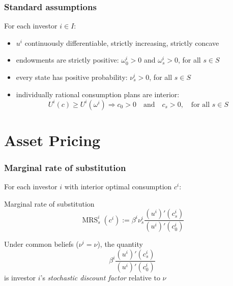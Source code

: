 \documentclass[blue]{beamer}
\def\geq{\geqslant}
\def\et{\quad \textrm{and} \quad}
\DeclareMathOperator\MRS{MRS}
\theoremstyle{definition}
\theoremstyle{example}
\begin{document}
\begin{frame}\frametitle{Standard assumptions}
For each investor $i \in I$:
\begin{itemize}
\item[(C.1)] $u^i$ continuously differentiable, strictly increasing, strictly concave
\item[(C.2)] endowments are strictly positive: $\omega^i_0 > 0$ and $\omega^i_s > 0$, for all $s\in S$
\item[(C.3)] every state has positive probability: $\nu^i_s > 0$, for all $s\in S$
\item[(C.4)] individually rational consumption plans are interior:
\begin{equation*}
U^i(c) \geq U^i(\omega^i) \Longrightarrow c_0 > 0 \et c_s > 0, \quad \text{for all $s\in S$}
\end{equation*}
\end{itemize}
\end{frame}

\section{Asset Pricing}

\begin{frame}\frametitle{Marginal rate of substitution}
For each investor $i$ with interior optimal consumption $c^i$:
\bigskip

\begin{block}{Marginal rate of substitution}
\begin{equation*}
\MRS^i_s(c^i) := \beta^i \nu^i_s \frac{(u^i)'(c^i_s)}{(u^i)'(c^i_0)}
\end{equation*}
\end{block}
\bigskip

Under common beliefs ($\nu^i = \nu$), the quantity
\begin{equation*}
\beta^i \frac{(u^i)'(c^i_s)}{(u^i)'(c^i_0)}
\end{equation*}
is investor $i$'s \emph{stochastic discount factor} relative to $\nu$
\end{frame}
\end{document}
